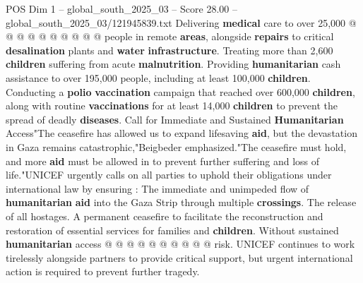 \begin{textsample}{POS Dim 1 – global\_south\_2025\_03 – Score 28.00 – global\_south\_2025\_03/121945839.txt}
Delivering \textbf{medical} care to over 25,000 @ @ @ @ @ @ @ @ @ @ people in remote \textbf{areas}, alongside \textbf{repairs} to critical \textbf{desalination} plants and \textbf{water} \textbf{infrastructure}.
Treating more than 2,600 \textbf{children} suffering from acute \textbf{malnutrition}.
Providing \textbf{humanitarian} cash assistance to over 195,000 people, including at least 100,000 \textbf{children}.
Conducting a \textbf{polio} \textbf{vaccination} campaign that reached over 600,000 \textbf{children}, along with routine \textbf{vaccinations} for at least 14,000 \textbf{children} to prevent the spread of deadly \textbf{diseases}.
Call for Immediate and Sustained \textbf{Humanitarian} Access"The ceasefire has allowed us to expand lifesaving \textbf{aid}, but the devastation in Gaza remains catastrophic,"Beigbeder emphasized."The ceasefire must hold, and more \textbf{aid} must be allowed in to prevent further suffering and loss of life."UNICEF urgently calls on all parties to uphold their obligations under international law by ensuring : The immediate and unimpeded flow of \textbf{humanitarian} \textbf{aid} into the Gaza Strip through multiple \textbf{crossings}.
The release of all hostages.
A permanent ceasefire to facilitate the reconstruction and restoration of essential services for families and \textbf{children}.
Without sustained \textbf{humanitarian} access @ @ @ @ @ @ @ @ @ @ risk.
UNICEF continues to work tirelessly alongside partners to provide critical support, but urgent international action is required to prevent further tragedy.

\end{textsample}
